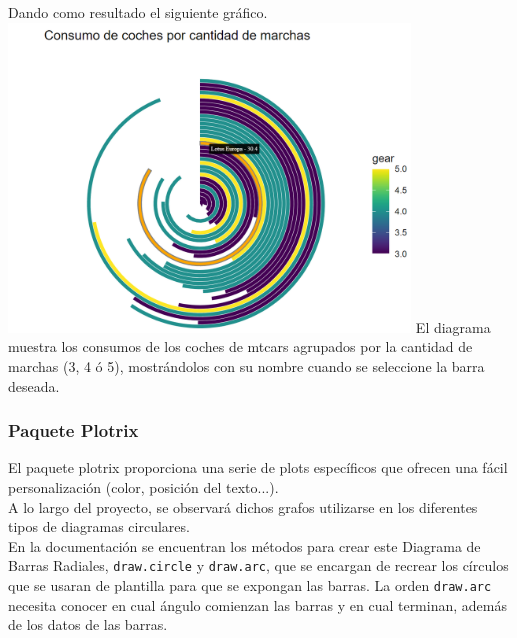 \documentclass{article}\usepackage[]{graphicx}\usepackage[]{color}
\begin{document}
Dando como resultado el siguiente gr\'afico.~\\
\vbox{
    \centering
    \includegraphics[width=0.8\textwidth]{imag/bar_interactive}
}
El diagrama muestra los consumos de los coches de mtcars agrupados por la cantidad de marchas (3, 4 \'o 5), mostr\'andolos con su nombre cuando se seleccione la barra deseada.
\clearpage
\subsubsection{Paquete Plotrix}
El paquete plotrix proporciona una serie de plots espec\'ificos que ofrecen una f\'acil personalizaci\'on (color, posici\'on del texto...).~\\
A lo largo del proyecto, se observar\'a dichos grafos utilizarse en los diferentes tipos de diagramas circulares.~\\
En la documentaci\'on\cite{docu_plotrix} se encuentran los m\'etodos para crear este Diagrama de Barras Radiales, \texttt{draw.circle} y \texttt{draw.arc}, que se encargan de recrear los c\'irculos que se usaran de plantilla para que se expongan las barras. La orden \texttt{draw.arc} necesita conocer en cual \'angulo comienzan las barras y en cual terminan, adem\'as de los datos de las barras.
\end{document}
